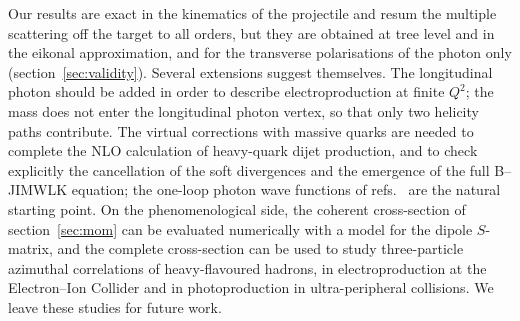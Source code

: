 Our results are exact in the kinematics of the projectile and resum the multiple scattering off the
target to all orders, but they are obtained at tree level and in the eikonal approximation, and for
the transverse polarisations of the photon only (section~\ref{sec:validity}). Several extensions
suggest themselves. The longitudinal photon should be added in order to describe electroproduction at
finite $Q^2$; the mass does not enter the longitudinal photon vertex, so that only two helicity paths
contribute. The virtual corrections with massive quarks are needed to complete the NLO calculation of
heavy-quark dijet production, and to check explicitly the cancellation of the soft divergences and the
emergence of the full B--JIMWLK equation; the one-loop photon wave functions of
refs.~\cite{Beuf:2021srj,Beuf:2022ndu} are the natural starting point. On the phenomenological side,
the coherent cross-section of section~\ref{sec:mom} can be evaluated numerically with a model for the
dipole $S$-matrix, and the complete cross-section can be used to study three-particle azimuthal
correlations of heavy-flavoured hadrons, in electroproduction at the Electron--Ion Collider and in
photoproduction in ultra-peripheral collisions. We leave these studies for future work.
